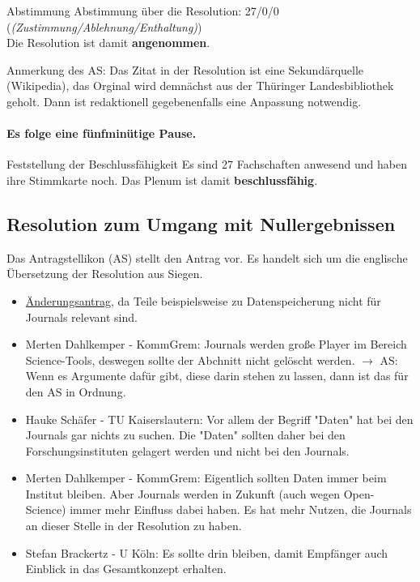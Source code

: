     \begin{success}{Abstimmung}
      Abstimmung über die Resolution: 27/0/0 (\textit{(Zustimmung/Ablehnung/Enthaltung)}) \\
      Die Resolution ist damit \textbf{angenommen}.
    \end{success}

    Anmerkung des AS: Das Zitat in der Resolution ist eine Sekundärquelle (Wikipedia), das Orginal wird demnächst aus der Thüringer Landesbibliothek geholt. Dann ist redaktionell gegebenenfalls eine Anpassung notwendig.

    \paragraph{Es folge eine fünfminütige Pause.}

    \begin{success}{Feststellung der Beschlussfähigkeit}
      Es sind 27 Fachschaften anwesend und haben ihre Stimmkarte noch.
      Das Plenum ist damit \textbf{beschlussfähig}.
    \end{success}

  \subsection{Resolution zum Umgang mit Nullergebnissen}
    Das Antragstellikon (AS) stellt den Antrag vor. Es handelt sich um die englische Übersetzung der Resolution aus Siegen.
    \begin{itemize}
      \item \underline{Änderungsantrag}, da Teile beispielsweise zu Datenspeicherung nicht für Journals relevant sind.
      \item Merten Dahlkemper - KommGrem:  Journals werden große Player im Bereich Science-Tools, deswegen sollte der Abchnitt nicht gelöscht werden.
        $\rightarrow$ AS: Wenn es Argumente dafür gibt, diese darin stehen zu lassen, dann ist das für den AS in Ordnung.
      \item Hauke Schäfer - TU Kaiserslautern:  Vor allem der Begriff "Daten" hat bei den Journals gar nichts zu suchen. Die "Daten" sollten daher bei den Forschungsinstituten gelagert werden und nicht bei den Journals.
      \item Merten Dahlkemper - KommGrem:  Eigentlich sollten Daten immer beim Institut bleiben. Aber Journals werden in Zukunft (auch wegen Open-Science) immer mehr Einfluss dabei haben.
      Es hat mehr Nutzen, die Journals an dieser Stelle in der Resolution zu haben.
      \item Stefan Brackertz - U Köln:  Es sollte drin bleiben, damit Empfänger auch Einblick in das Gesamtkonzept erhalten.
    \end{itemize}

